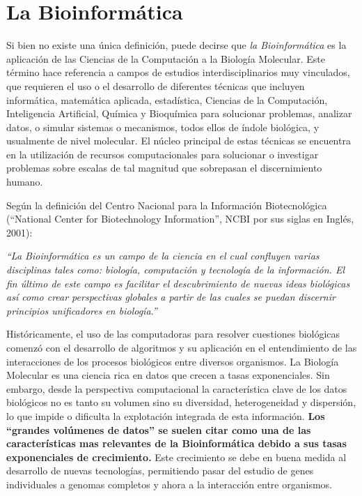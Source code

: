 \section*{La Bioinformática}
\par Si bien no existe una única definición, puede decirse que \emph{la Bioinformática} es la aplicación de las Ciencias de la Computación a la Biología Molecular. Este término hace referencia a campos de estudios interdisciplinarios muy vinculados, que requieren el uso o el desarrollo de diferentes técnicas que incluyen informática, matemática aplicada, estadística, Ciencias de la Computación, Inteligencia Artificial, Química y Bioquímica para solucionar problemas, analizar datos, o simular sistemas o mecanismos, todos ellos de índole biológica, y usualmente de nivel molecular. El núcleo principal de estas técnicas se encuentra en la utilización de recursos computacionales para solucionar o investigar problemas sobre escalas de tal magnitud que sobrepasan el discernimiento humano. 
\par Según la definición del Centro Nacional para la Información Biotecnológica (``National Center for Biotechnology Information'', NCBI por sus siglas en Inglés, 2001):
\begin{center}
\emph{``La Bioinformática es un campo de la ciencia en el cual confluyen varias disciplinas tales como: biología, computación y tecnología de la información. El fin último de este campo es facilitar el descubrimiento de nuevas ideas biológicas así como crear perspectivas globales a partir de las cuales se puedan discernir principios unificadores en biología.''}
\end{center}

\par Históricamente, el uso de las computadoras para resolver cuestiones biológicas comenzó con el desarrollo de algoritmos y su aplicación en el entendimiento de las interacciones de los procesos biológicos entre diversos organismos. La Biología Molecular es una ciencia rica en datos que crecen a tasas exponenciales\cite{NCBI}. Sin embargo, desde la perspectiva computacional la característica clave de los datos biológicos no es tanto su volumen sino su diversidad, heterogeneidad y dispersión, lo que impide o dificulta la explotación integrada de esta información.
\textbf{Los ``grandes volúmenes de datos'' se suelen citar como una de las características mas relevantes de la Bioinformática debido a sus tasas exponenciales de crecimiento.} Este crecimiento se debe en buena medida al desarrollo de nuevas tecnologías, permitiendo pasar del estudio de genes individuales a genomas completos y ahora a la interacción entre organismos.

